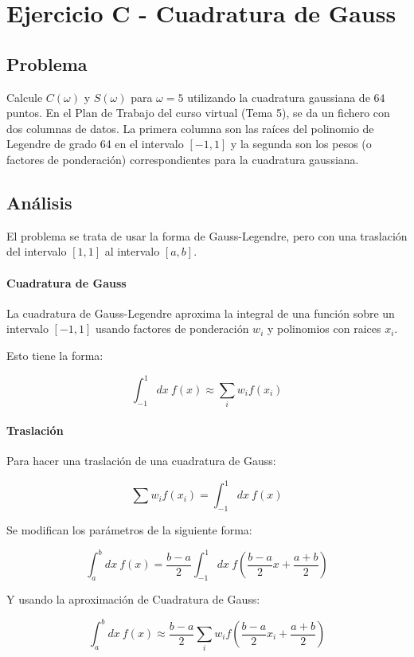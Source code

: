 \section{Ejercicio C - Cuadratura de Gauss}


\subsection{Problema}

Calcule $C(\omega)$ y $S(\omega)$ para $\omega = 5$ utilizando la cuadratura gaussiana de $64$ puntos. En el Plan de Trabajo del curso virtual (Tema 5), se da un fichero con dos columnas de datos. La primera columna son las raíces del polinomio de Legendre de grado 64 en el intervalo $[-1, 1]$ y la segunda son los pesos (o factores de ponderación) correspondientes para la cuadratura gaussiana.

\subsection{Análisis}

El problema se trata de usar la forma de Gauss-Legendre, pero con una traslación del intervalo $[1, 1]$ al intervalo $[a, b]$.

\paragraph{Cuadratura de Gauss}

La cuadratura de Gauss-Legendre aproxima la integral de una función sobre un intervalo $[-1, 1]$ usando factores de ponderación $w_i$ y polinomios con raices $x_i$.

Esto tiene la forma:

$$
\int_{-1}^{1} dx ~ f(x) 
\approx \sum_{i} w_i f(x_i)
$$


\paragraph{Traslación}
Para hacer una traslación de una cuadratura de Gauss:

$$ \sum w_i f(x_i) = \int_{-1}^{1} dx ~ f(x) $$ 

Se modifican los parámetros de la siguiente forma: 

$$
\int_{a}^{b}dx~ f(x) = \frac{b - a}{2} \int_{-1}^{1} dx ~ f( \frac{b-a}{2} x + \frac{a + b}{2})
$$

Y usando la aproximación de Cuadratura de Gauss:

\begin{equation*}
\int_{a}^{b}dx~ f(x) \approx
\frac{b - a}{2}
\sum_{i}w_i f(\frac{b-a}{2} x_i + \frac{a + b}{2} )
\end{equation*}



